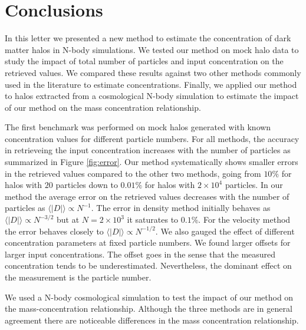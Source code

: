 \documentclass[a4,useAMS,usenatbib,usegraphicx]{mn2e}
\begin{document}
\section{Conclusions}
\label{sec:conclusions}

In this letter we presented a new method to estimate the concentration
of dark matter halos in N-body simulations.  
We tested our method on mock halo data to study the impact of total
number of particles and input concentration on the retrieved values.  
We compared these
results against two other methods commonly used in the literature to
estimate concentrations.  Finally, we applied our method to halos
extracted from a cosmological N-body simulation to estimate the impact
of our method on the mass concentration relationship.


The first benchmark was performed on mock halos generated with known
concentration values for different particle numbers.  For all methods,
the accuracy in retrieveing the input concentration increases with the
number of particles as summarized in Figure \ref{fig:error}.  Our
method systematically shows smaller errors in the retrieved values
compared to the other two methods, going from $10\%$ for halos with
$20$ particles down to $0.01\%$ for halos with $2\times 10^4$
particles.  In our method the average error on the retrieved values
decreases with the number of particles as $\langle|D|\rangle\propto
N^{-1}$.  The error in density method initially behaves as
$\langle|D|\rangle\propto N^{-3/2}$ but at $N=2\times 10^3$ it
saturates to $0.1\%$.  For the velocity method the error behaves
closely to $\langle|D|\rangle\propto N^{-1/2}$.  We also gauged the
effect of different concentration parameters at fixed particle
numbers.  We found larger offsets for larger input concentrations.
The offset goes in the sense that the measured concentration tends to
be underestimated.  Nevertheless, the dominant effect on the
measurement is the particle number.

We used a N-body cosmological simulation to test the impact of our
method on the mass-concentration relationship.  Although the three
methods are in general agreement there are noticeable differences in
the mass concentration relationship.





\end{document}
